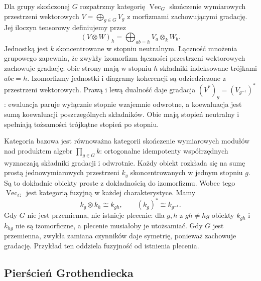 \begin{przyklad}\label{cat:ex:tf-graded-vector-spaces}
Dla grupy skończonej $G$ rozpatrzmy kategorię $\operatorname{Vec}_G$ skończenie wymiarowych przestrzeni wektorowych $V=\bigoplus_{g\in G}V_g$ z morfizmami zachowującymi gradację. Jej iloczyn tensorowy definiujemy przez
\[
 (V\otimes W)_h=\bigoplus_{ab=h}V_a\otimes_k W_b.
\]
Jednostką jest $k$ skoncentrowane w stopniu neutralnym. Łączność mnożenia grupowego zapewnia, że zwykły izomorfizm łączności przestrzeni wektorowych zachowuje gradację: obie strony mają w stopniu $h$ składniki indeksowane trójkami $abc=h$. Izomorfizmy jednostki i diagramy koherencji są odziedziczone z przestrzeni wektorowych. Prawą i lewą dualność daje gradacja $(V^*)_g=(V_{g^{-1}})^*$: ewaluacja paruje wyłącznie stopnie wzajemnie odwrotne, a koewaluacja jest sumą koewaluacji poszczególnych składników. Obie mają stopień neutralny i spełniają tożsamości trójkątne stopień po stopniu.

Kategoria bazowa jest równoważna kategorii skończenie wymiarowych modułów nad produktem algebr $\prod_{g\in G}k$: ortogonalne idempotenty współrzędnych wyznaczają składniki gradacji i odwrotnie. Każdy obiekt rozkłada się na sumę prostą jednowymiarowych przestrzeni $k_g$ skoncentrowanych w jednym stopniu $g$. Są to dokładnie obiekty proste z dokładnością do izomorfizmu. Wobec tego $\operatorname{Vec}_G$ jest kategorią fuzyjną w każdej charakterystyce. Mamy
\[
 k_g\otimes k_h\cong k_{gh},\qquad (k_g)^*\cong k_{g^{-1}}.
\]
Gdy $G$ nie jest przemienna, nie istnieje plecenie: dla $g,h$ z $gh\neq hg$ obiekty $k_{gh}$ i $k_{hg}$ nie są izomorficzne, a plecenie musiałoby je utożsamiać. Gdy $G$ jest przemienna, zwykła zamiana czynników daje symetrię, ponieważ zachowuje gradację. Przykład ten oddziela fuzyjność od istnienia plecenia.
\end{przyklad}

\subsection{Pierścień Grothendiecka}

